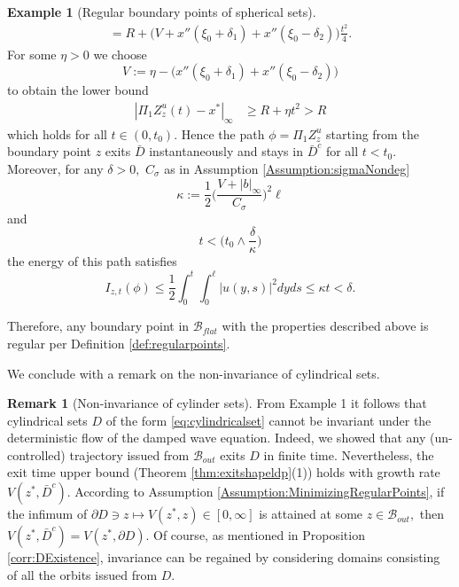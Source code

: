 \documentclass[10pt, reqno]{amsart}
\theoremstyle{definition}
\newtheorem{rem}{Remark}
\newtheorem{example}{Example}
\numberwithin{lem}{section}
\numberwithin{cor}{section}
\numberwithin{prop}{section}
\numberwithin{thm}{section}
\numberwithin{dfn}{section}
\begin{document}
\begin{example}[Regular boundary points of spherical sets]
\begin{equation*}
\begin{aligned}
      =  %
   R+\bigg(V+x''(\xi_0+\delta_1)+x''(\xi_0-\delta_2)  \bigg)\frac{t^2}{4}.
\end{aligned}
\end{equation*}
For some $\eta>0$ we choose
$$V:=\eta-\bigg(x''(\xi_0+\delta_1)+x''(\xi_0-\delta_2)\bigg) $$ to obtain the lower bound
\begin{equation*}
     \begin{aligned}
     |\Pi_1Z^u_z(t)-x^*|_\infty&
      \geq   R+\eta t^2>R 
\end{aligned}
\end{equation*}
which holds for all $t\in(0,t_0).$ Hence the path $\phi=\Pi_1Z^u_z$ starting from the boundary point $z$ exits $\bar{D}$ instantaneously and stays in $\bar{D}^c$ for all $t<t_0.$
Moreover, for any $\delta>0,$ $C_\sigma$ as in Assumption \ref{Assumption:sigmaNondeg}
$$\kappa:= \frac{1}{2}\bigg(\frac{V+|b|_\infty}{C_\sigma}\bigg)^2\ell$$
and
$$t<\bigg(t_0\wedge\frac{\delta}{\kappa}   \bigg)$$
the energy of this path satisfies
\begin{equation*}
    I_{z,t}(\phi)\leq \frac{1}{2}\int_{0}^{t}\int_{0}^{\ell}|u(y, s)|^2dyds\leq\kappa t<\delta.
\end{equation*}

Therefore, any boundary point in $\mathcal{B}_{flat}$ with the properties described above is regular per Definition \ref{def:regularpoints}.
\end{example}

      
     
We conclude with a remark on the non-invariance of cylindrical sets.

\begin{rem}[Non-invariance of cylinder sets]\label{rem:cylinderNonInvariance} From Example 1 it follows that cylindrical sets $D$ of the form \eqref{eq:cylindricalset} cannot be invariant under the deterministic flow of the damped wave equation. Indeed, we showed that any (un-controlled) trajectory issued from $\mathcal{B}_{out}$ exits $D$ in finite time. Nevertheless, the exit time upper bound (Theorem \ref{thm:exitshapeldp}(1)) holds with growth rate $V(z^*, \bar{D}^c).$ According to Assumption \eqref{Assumption:MinimizingRegularPoints}, if the infimum of $\partial D\ni z\mapsto V(z^*,z)\in[0,\infty]$ is attained at some $z\in\mathcal{B}_{out},$ then $V(z^*, \bar{D}^c)=V(z^*, \partial D).$ Of course, as mentioned in Proposition \ref{corr:DExistence}, invariance can be regained by considering domains consisting of all the orbits issued from $D.$ 
\end{rem}
\end{document}
